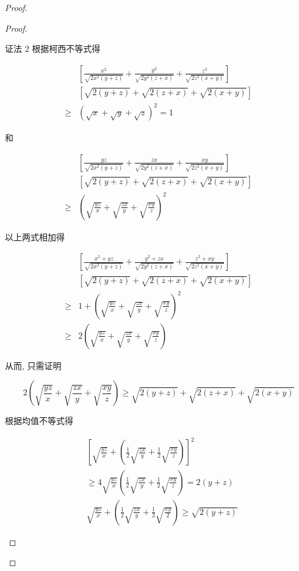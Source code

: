 \begin{proof}
\begin{example}
\begin{solution}
\begin{note}
\begin{solution}
\begin{proof}
\begin{example}
	证法 2 根据柯西不等式得
	
	$$
	\begin{aligned}
	& {\left[\frac{x^{2}}{\sqrt{2 x^{2}(y+z)}}+\frac{y^{2}}{\sqrt{2 y^{2}(z+x)}}+\frac{z^{2}}{\sqrt{2 z^{2}(x+y)}}\right] } \\
	& {[\sqrt{2(y+z)}+\sqrt{2(z+x)}+\sqrt{2(x+y)}] } \\
	\geqslant & (\sqrt{x}+\sqrt{y}+\sqrt{z})^{2}=1
	\end{aligned}
	$$
	
	和
	
	$$
	\begin{aligned}
	& {\left[\frac{y z}{\sqrt{2 x^{2}(y+z)}}+\frac{z x}{\sqrt{2 y^{2}(z+x)}}+\frac{x y}{\sqrt{2 z^{2}(x+y)}}\right] } \\
	& {[\sqrt{2(y+z)}+\sqrt{2(z+x)}+\sqrt{2(x+y)}] } \\
	\geqslant & \left(\sqrt{\frac{y z}{x}}+\sqrt{\frac{z x}{y}}+\sqrt{\frac{x y}{z}}\right)^{2}
	\end{aligned}
	$$
	
	以上两式相加得
	
	$$
	\begin{aligned}
	& {\left[\frac{x^{2}+y z}{\sqrt{2 x^{2}(y+z)}}+\frac{y^{2}+z x}{\sqrt{2 y^{2}(z+x)}}+\frac{z^{2}+x y}{\sqrt{2 z^{2}(x+y)}}\right] } \\
	& {[\sqrt{2(y+z)}+\sqrt{2(z+x)}+\sqrt{2(x+y)}] } \\
	\geqslant & 1+\left(\sqrt{\frac{y z}{x}}+\sqrt{\frac{z x}{y}}+\sqrt{\frac{x y}{z}}\right)^{2} \\
	\geqslant & 2\left(\sqrt{\frac{y z}{x}}+\sqrt{\frac{z x}{y}}+\sqrt{\frac{x y}{z}}\right)
	\end{aligned}
	$$
	
	从而, 只需证明
	
	$$
	2\left(\sqrt{\frac{y z}{x}}+\sqrt{\frac{z x}{y}}+\sqrt{\frac{x y}{z}}\right) \geqslant \sqrt{2(y+z)}+\sqrt{2(z+x)}+\sqrt{2(x+y)}
	$$
	
	根据均值不等式得
	
	$$
	\begin{aligned}
	& {\left[\sqrt{\frac{y z}{x}}+\left(\frac{1}{2} \sqrt{\frac{z x}{y}}+\frac{1}{2} \sqrt{\frac{x y}{z}}\right)\right]^{2} } \\
	& \geqslant 4 \sqrt{\frac{y z}{x}}\left(\frac{1}{2} \sqrt{\frac{z x}{y}}+\frac{1}{2} \sqrt{\frac{x y}{z}}\right)=2(y+z) \\
	& \sqrt{\frac{y z}{x}}+\left(\frac{1}{2} \sqrt{\frac{z x}{y}}+\frac{1}{2} \sqrt{\frac{x y}{2}}\right) \geqslant \sqrt{2(y+z)}
	\end{aligned}
	$$
	

\end{example}
\end{proof}
\end{solution}
\end{note}
\end{solution}
\end{example}
\end{proof}
